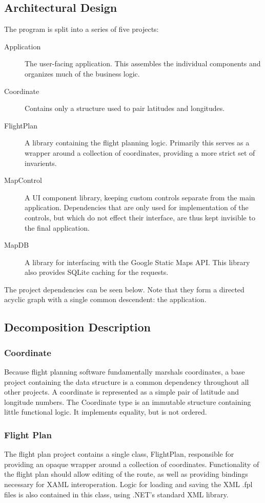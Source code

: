 \documentclass[12pt, letterpaper]{article}
\begin{document}
\newpage
\subsection{Architectural Design}
The program is split into a series of five projects:
\begin{description}
  \item[Application] The user-facing application.
    This assembles the individual components and organizes much of the business logic.
  \item[Coordinate] Contains only a structure used to pair latitudes and longitudes.
  \item[FlightPlan] A library containing the flight planning logic.
    Primarily this serves as a wrapper around a collection of coordinates, providing a more strict set of invarients.
  \item[MapControl] A UI component library, keeping custom controls separate from the main application.
    Dependencies that are only used for implementation of the controls, but which do not effect their interface, are thus kept invisible to the final application.
  \item[MapDB] A library for interfacing with the Google Static Maps API.
    This library also provides SQLite caching for the requests.
\end{description}
The project dependencies can be seen below.
Note that they form a directed acyclic graph with a single common descendent: the application.

\subsection{Decomposition Description}
\subsubsection{Coordinate}
Because flight planning software fundamentally marshals coordinates,
a base project containing the data structure is a common dependency throughout all other projects.
A coordinate is represented as a simple pair of latitude and longitude numbers.
The Coordinate type is an immutable structure containing little functional logic.
It implements equality, but is not ordered.

\subsubsection{Flight Plan}
The flight plan project contains a single class, FlightPlan, responsible for providing an opaque wrapper around a collection of coordinates.
Functionality of the flight plan should allow editing of the route, as well as providing bindings necessary for XAML interoperation.
Logic for loading and saving the XML .fpl files is also contained in this class, using .NET's standard XML library.
\end{document}
